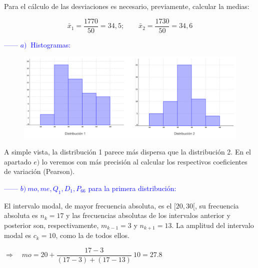 Para el cálculo de las desviaciones es necesario, previamente, calcular la medias:

\vspace{-4mm}%
$$\bar x_1=\dfrac{1770}{50}=34,5; \qquad \bar x_2=\dfrac{1730}{50}=34,6$$

\textcolor{blue}{------ $a)\ $  Histogramas:}
\begin{figure}[H]
			\centering
			\includegraphics[width=.9\textwidth]{imagenes/imagenes01/T01IM22.png}
	\end{figure}


\vspace{-4mm} %
A simple vista, la distribución 1 parece más dispersa que la distribución 2. En el apartado $e)$ lo veremos con más precisión al calcular los respectivos coeficientes de variación (Pearson). 
	
\textcolor{blue}{------ $b)\  mo, me, Q_1, D_1, P_{66}$ para la primera distribución:}

El intervalo modal, de mayor frecuencia absoluta, es el $[20,30[$, su frecuencia absoluta es $n_k=17$ y las frecuencias absolutas de los intervalos anterior y posterior	son, respectivamente, $m_{k-1}=3$ y $n_{k+1}=13$. La amplitud del intervalo modal es $c_k=10$, como la de todos ellos.
	
$\Rightarrow \quad mo=20+\dfrac{17-3}{(17-3)+(17-13)}\ 10=27.8$

